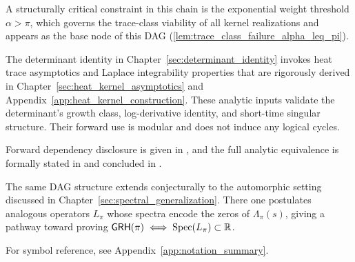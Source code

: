A structurally critical constraint in this chain is the exponential weight threshold \( \alpha > \pi \), which governs the trace-class viability of all kernel realizations and appears as the base node of this DAG (\cref{lem:trace_class_failure_alpha_leq_pi}).

\begin{remark}
The determinant identity in Chapter~\ref{sec:determinant_identity} invokes heat trace asymptotics and Laplace integrability properties that are rigorously derived in Chapter~\ref{sec:heat_kernel_asymptotics} and Appendix~\ref{app:heat_kernel_construction}. These analytic inputs validate the determinant’s growth class, log-derivative identity, and short-time singular structure. Their forward use is modular and does not induce any logical cycles.
\end{remark}

Forward dependency disclosure is given in , and the full analytic equivalence is formally stated in  and concluded in .

The same DAG structure extends conjecturally to the automorphic setting discussed in Chapter~\ref{sec:spectral_generalization}.  There one postulates analogous operators \(L_\pi\) whose spectra encode the zeros of \(\Lambda_\pi(s)\), giving a pathway toward proving \(\mathsf{GRH}(\pi) \iff \operatorname{Spec}(L_\pi) \subset \mathbb{R}\).

For symbol reference, see Appendix~\ref{app:notation_summary}.
